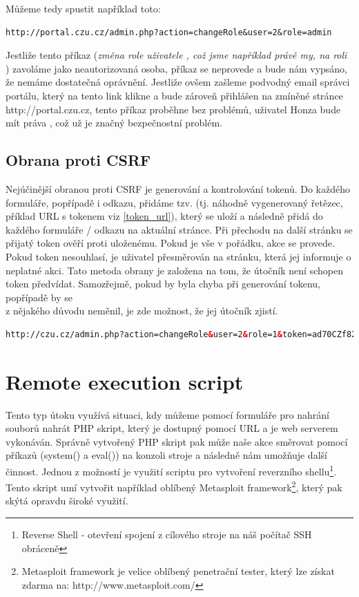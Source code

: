 \documentclass[12pt, a4paper]{report}
\begin{document}
Můžeme tedy spustit například toto:
\begin{lstlisting}[label=csfr_example1,caption=URL změny uživatelské role]
http://portal.czu.cz/admin.php?action=changeRole&user=2&role=admin
\end{lstlisting}

Jestliže tento příkaz (\textit{změna role uživatele , což jsme například právě my, na roli }) zavoláme jako neautorizovaná osoba, příkaz se neprovede a bude nám vypsáno, že nemáme dostatečná oprávnění. Jestliže ovšem zašleme podvodný email správci portálu, který na tento link klikne a bude zároveň přihlášen na zmíněné stránce {http://portal.czu.cz}, tento příkaz proběhne bez problémů, uživatel Honza bude mít práva , což už je značný bezpečnostní problém.

\subsection{Obrana proti CSRF}
Nejúčinější obranou proti CSRF je generování a kontrolování tokenů. Do každého formuláře, popřípadě i odkazu, přidáme tzv.  (tj. náhodně vygenerovaný řetězec, příklad URL s tokenem viz \ref{token_url}), který se uloží a následně přidá do každého formuláře / odkazu na aktuální stránce. Při přechodu na další stránku se přijatý token ověří proti uloženému. Pokud je vše v pořádku, akce se provede. Pokud token nesouhlasí, je uživatel přesměrován na  stránku, která jej informuje o neplatné akci. Tato metoda obrany je založena na tom, že útočník není schopen token předvídat. Samozřejmě, pokud by byla chyba při generování tokenu, popřípadě by se \\z nějakého důvodu neměnil, je zde možnost, že jej útočník zjistí.

\begin{lstlisting}[label=token_url,language=HTML, caption=CSRF obrana - token]
http://czu.cz/admin.php?action=changeRole&user=2&role=1&token=ad70CZf82
\end{lstlisting}

\section{Remote execution script}
Tento typ útoku využívá situaci, kdy můžeme pomocí formuláře pro nahrání souborů nahrát PHP skript, který je dostupný pomocí URL a je web serverem vykonáván. Správně vytvořený PHP skript pak může naše akce směrovat pomocí příkazů (system() a eval()) na konzoli stroje a následně nám umožňuje další činnost. Jednou z možností je využití scriptu pro vytvoření reverzního shellu\footnote{Reverse Shell - otevření spojení z cílového stroje na náš počítač  SSH obráceně}. Tento skript umí vytvořit například oblíbený Metasploit framework\footnote{Metasploit framework je velice oblíbený penetrační tester, který lze získat zdarma na: http://www.metasploit.com/}, který pak skýtá opravdu široké využití.
\end{document}
